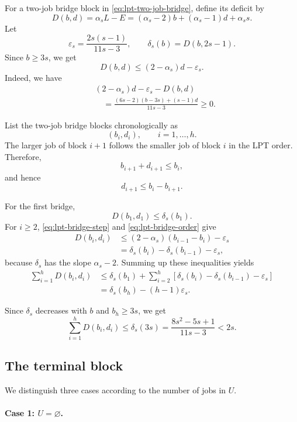 \documentclass[11pt]{article}
\begin{document}
For a two-job bridge block in \eqref{eq:lpt-two-job-bridge}, define its deficit
by
\[
D(b,d)
=
\alpha_sL-E
=
(\alpha_s-2)b+(\alpha_s-1)d+\alpha_ss.
\tag{A.7}
\label{eq:lpt-bridge-deficit}
\]
Let
\[
\varepsilon_s
=
\frac{2s(s-1)}{11s-3},
\qquad
\delta_s(b)=D(b,2s-1).
\]
Since \(b\ge3s\), we get 
\[
D(b,d)
\le
(2-\alpha_s)d-\varepsilon_s.
\tag{A.8}
\label{eq:lpt-bridge-step}
\]
Indeed, we have
\[
\begin{aligned}
&(2-\alpha_s)d-\varepsilon_s-D(b,d)\\
&\quad=
\frac{(6s-2)(b-3s)+(s-1)d}{11s-3}
\ge0.
\end{aligned}
\]

List the two-job bridge blocks chronologically as
\[
(b_i,d_i),
\qquad i=1,\ldots,h.
\]
The larger job of block \(i+1\) follows the smaller job of block \(i\) in the
LPT order. Therefore,
\[
b_{i+1}+d_{i+1}\le b_i,
\]
and hence
\[
d_{i+1}\le b_i-b_{i+1}.
\tag{A.9}
\label{eq:lpt-bridge-order}
\]

For the first bridge,
\[
D(b_1,d_1)\le\delta_s(b_1).
\]
For \(i\ge2\), \eqref{eq:lpt-bridge-step} and
\eqref{eq:lpt-bridge-order} give
\[
\begin{aligned}
D(b_i,d_i)
&\le
(2-\alpha_s)(b_{i-1}-b_i)-\varepsilon_s\\
&=
\delta_s(b_i)-\delta_s(b_{i-1})-\varepsilon_s,
\end{aligned}
\]
because \(\delta_s\) has the slope \(\alpha_s-2\). Summing up these inequalities
yields
\[
\begin{aligned}
\sum_{i=1}^{h}D(b_i,d_i)
&\le
\delta_s(b_1)
+
\sum_{i=2}^{h}
\left[
\delta_s(b_i)-\delta_s(b_{i-1})-\varepsilon_s
\right]\\
&=
\delta_s(b_h)-(h-1)\varepsilon_s.
\end{aligned}
\tag{A.10}
\label{eq:lpt-bridge-telescope}
\]

Since \(\delta_s\) decreases with \(b\) and \(b_h\ge3s\), we get 
\[
\sum_{i=1}^{h}D(b_i,d_i)
\le
\delta_s(3s)
=
\frac{8s^2-5s+1}{11s-3}
<2s.
\tag{A.11}
\label{eq:lpt-total-bridge-deficit}
\]

\subsection{The terminal block}
\label{appsub:lpt-terminal-block}

We distinguish three cases according to the number of jobs in \(U\).

\paragraph{Case 1: \(U=\varnothing\).}
\end{document}

